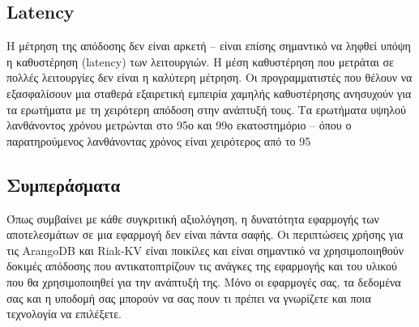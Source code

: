\documentclass[conference]{IEEEtran}
\begin{document}
\subsection{Latency}
Η μέτρηση της απόδοσης δεν είναι αρκετή – είναι επίσης σημαντικό να ληφθεί υπόψη 
η καθυστέρηση (latency) των λειτουργιών. Η μέση καθυστέρηση που μετράται σε πολλές 
λειτουργίες δεν είναι η καλύτερη μέτρηση. Οι προγραμματιστές που θέλουν να 
εξασφαλίσουν μια σταθερά εξαιρετική εμπειρία χαμηλής καθυστέρησης ανησυχούν 
για τα ερωτήματα με τη χειρότερη απόδοση στην ανάπτυξή τους. Τα ερωτήματα 
υψηλού λανθάνοντος χρόνου μετρώνται στο 95ο και 99ο εκατοστημόριο – όπου ο 
παρατηρούμενος λανθάνοντας χρόνος είναι χειρότερος από το 95%





\subsection{Συμπεράσματα}

Όπως συμβαίνει με κάθε συγκριτική αξιολόγηση, η δυνατότητα εφαρμογής των 
αποτελεσμάτων σε μια εφαρμογή δεν είναι πάντα σαφής. Οι περιπτώσεις χρήσης για τις
ArangoDB και Riak-KV είναι ποικίλες και είναι σημαντικό να χρησιμοποιηθούν
δοκιμές απόδοσης που αντικατοπτρίζουν τις ανάγκες της εφαρμογής και του υλικού που θα 
χρησιμοποιηθεί για την ανάπτυξή της.  
Μόνο οι εφαρμογές σας, τα δεδομένα σας και η υποδομή σας μπορούν να σας πουν 
τι πρέπει να γνωρίζετε και ποια τεχνολογία να επιλέξετε. 
\end{document}
